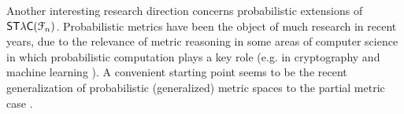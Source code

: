 %
%


Another interesting research direction concerns probabilistic extensions of $\mathsf{ST\lambda C}(\mathcal F_{n})$. 
Probabilistic metrics \cite{1029849,KOZEN1981328, 10.1109/LICS.2015.64, 10.1007/978-3-662-54434-1_13} have been the object of much research in recent years, due to the relevance of metric reasoning in some areas of computer science in which probabilistic computation plays a key role (e.g. in cryptography \cite{GOLDWASSER1984270} and machine learning \cite{krause08robust}).
A convenient starting point seems to be the recent generalization of {probabilistic (generalized) metric spaces} to the partial metric case \cite{HE201999}.




